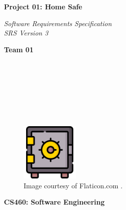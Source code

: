 \documentclass{article}
\begin{document}
\begin{titlepage}
\begin{center}
\vspace*{1cm}

\Huge
\textbf{Project 01: Home Safe}

\vspace{0.5cm}
\Large
\textit{Software Requirements Specification} \\
\textit{SRS Version 3}

\vspace{1cm}

\textbf{Team 01}

\vspace{0.5cm}

 \\
 \\
 \\
 \\
 \\
 \\

\vspace{1cm}

\begin{figure}[h]
    \centering
    \includegraphics[width=0.25\textwidth]{docs/figs/safe.png}
    \caption*{Image courtesy of Flaticon.com \cite{flaticonSafeDeposit}.}
    \label{fig:safeIcon}
\end{figure}

\vspace{7cm}

\Large
\textbf{CS460: Software Engineering} \\

\end{center}
\end{titlepage}

\newpage

\tableofcontents

\newpage
\end{document}
